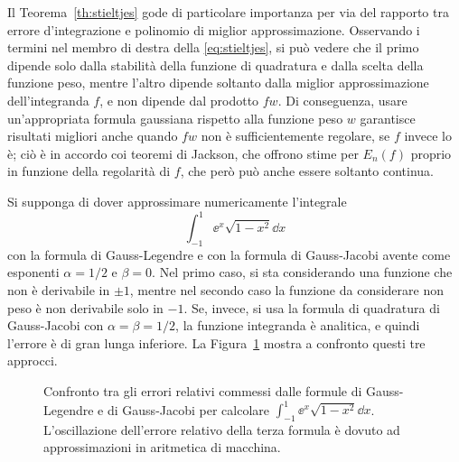 	Il Teorema~\ref{th:stieltjes} gode di particolare importanza per via del rapporto tra errore d'integrazione e polinomio di miglior approssimazione. Osservando i termini nel membro di destra della \eqref{eq:stieltjes}, si può vedere che il primo dipende solo dalla stabilità della funzione di quadratura e dalla scelta della funzione peso, mentre l'altro dipende soltanto dalla miglior approssimazione dell'integranda \(f\), e non dipende dal prodotto \(f w\). Di conseguenza, usare un'appropriata formula gaussiana rispetto alla funzione peso \(w\) garantisce risultati migliori anche quando \(f w\) non è sufficientemente regolare, se \(f\) invece lo è; ciò è in accordo coi teoremi di Jackson, che offrono stime per \(E_n (f)\) proprio in funzione della regolarità di \(f\), che però può anche essere soltanto continua.
	
	\begin{esempio}
		Si supponga di dover approssimare numericamente l'integrale
		\begin{equation*}
			\int_{-1}^1 \ee^x \sqrt{1 - x^2} \dd{x}
		\end{equation*}
		con la formula di Gauss-Legendre e con la formula di Gauss-Jacobi avente come esponenti \(\alpha = 1 / 2\) e \(\beta = 0\). Nel primo caso, si sta considerando una funzione che non è derivabile in \(\pm 1\), mentre nel secondo caso la funzione da considerare non peso è non derivabile solo in \(-1\). Se, invece, si usa la formula di quadratura di Gauss-Jacobi con \(\alpha = \beta = 1/2\), la funzione integranda è analitica, e quindi l'errore è di gran lunga inferiore. La Figura~\ref{fig:legendre-jacobi} mostra a confronto questi tre approcci.
		
		\begin{figure}[tpb]
			\centering
			
			
			\caption{Confronto tra gli errori relativi commessi dalle formule di Gauss-Legendre e di Gauss-Jacobi per calcolare \(\int_{-1}^1 \ee^x \sqrt{1 - x^2} \dd{x}\). L'oscillazione dell'errore relativo della terza formula è dovuto ad approssimazioni in aritmetica di macchina.}\label{fig:legendre-jacobi}
		\end{figure}
	\end{esempio}

